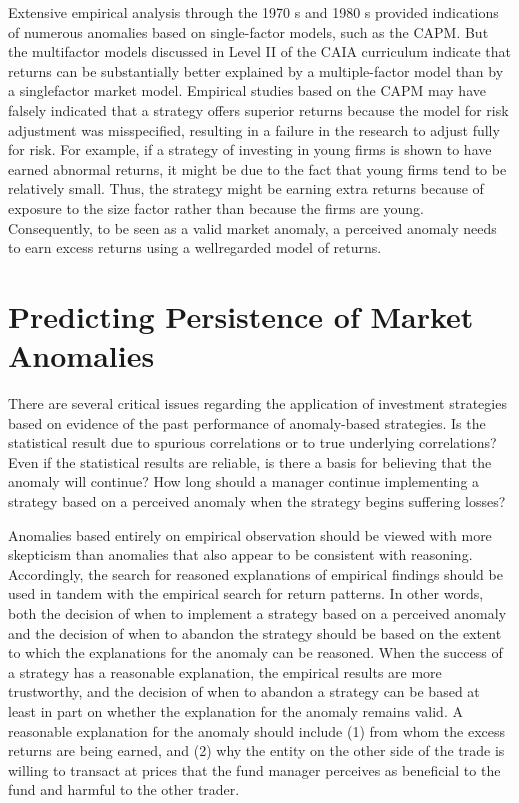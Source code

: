 \documentclass[11pt]{article}
\begin{document}
Extensive empirical analysis through the 1970 s and 1980 s provided indications of numerous anomalies based on single-factor models, such as the CAPM. But the multifactor models discussed in Level II of the CAIA curriculum indicate that returns can be substantially better explained by a multiple-factor model than by a singlefactor market model. Empirical studies based on the CAPM may have falsely indicated that a strategy offers superior returns because the model for risk adjustment was misspecified, resulting in a failure in the research to adjust fully for risk. For example, if a strategy of investing in young firms is shown to have earned abnormal returns, it might be due to the fact that young firms tend to be relatively small. Thus, the strategy might be earning extra returns because of exposure to the size factor rather than because the firms are young. Consequently, to be seen as a valid market anomaly, a perceived anomaly needs to earn excess returns using a wellregarded model of returns.

\section*{Predicting Persistence of Market Anomalies}
There are several critical issues regarding the application of investment strategies based on evidence of the past performance of anomaly-based strategies. Is the statistical result due to spurious correlations or to true underlying correlations? Even if the statistical results are reliable, is there a basis for believing that the anomaly will continue? How long should a manager continue implementing a strategy based on a perceived anomaly when the strategy begins suffering losses?

Anomalies based entirely on empirical observation should be viewed with more skepticism than anomalies that also appear to be consistent with reasoning. Accordingly, the search for reasoned explanations of empirical findings should be used in tandem with the empirical search for return patterns. In other words, both the decision of when to implement a strategy based on a perceived anomaly and the decision of when to abandon the strategy should be based on the extent to which the explanations for the anomaly can be reasoned. When the success of a strategy has a reasonable explanation, the empirical results are more trustworthy, and the decision of when to abandon a strategy can be based at least in part on whether the explanation for the anomaly remains valid. A reasonable explanation for the anomaly should include (1) from whom the excess returns are being earned, and (2) why the entity on the other side of the trade is willing to transact at prices that the fund manager perceives as beneficial to the fund and harmful to the other trader.
\end{document}

